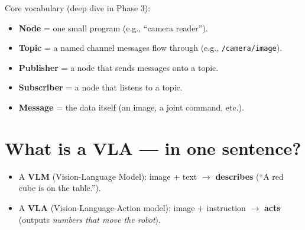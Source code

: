 \documentclass[11pt]{article}
\begin{document}
Core vocabulary (deep dive in Phase 3):
\begin{itemize}[leftmargin=*]
  \item \textbf{Node} = one small program (e.g., ``camera reader'').
  \item \textbf{Topic} = a named channel messages flow through (e.g., \texttt{/camera/image}).
  \item \textbf{Publisher} = a node that sends messages onto a topic.
  \item \textbf{Subscriber} = a node that listens to a topic.
  \item \textbf{Message} = the data itself (an image, a joint command, etc.).
\end{itemize}

\begin{center}
\end{center}

\section{What is a VLA --- in one sentence?}

\begin{itemize}[leftmargin=*]
  \item A \textbf{VLM} (Vision-Language Model): image $+$ text $\rightarrow$
        \textbf{describes} (``A red cube is on the table.'').
  \item A \textbf{VLA} (Vision-Language-Action model): image $+$ instruction
        $\rightarrow$ \textbf{acts} (outputs \emph{numbers that move the robot}).
\end{itemize}

\begin{center}
\end{center}
\end{document}
